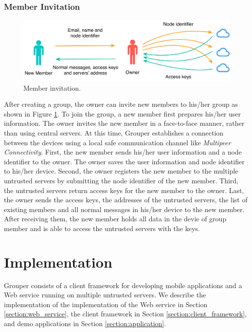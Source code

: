 \documentclass[a4paper,11pt]{report}
\begin{document}
\subsection{Member Invitation}

\begin{figure}
	\centering
	\includegraphics[scale=0.55]{add_member}
	\caption{Member invitation.}
	\label{fig:add_member}
\end{figure}

After creating a group, the owner can invite new members to his/her group as shown in Figure \ref{fig:add_member}. 
To join the group, a new member first prepares his/her user information. 
The owner invites the new member in a face-to-face manner, rather than using central servers. 
At this time, Grouper establishes a connection between the devices using a local safe communication channel like \emph{Multipeer Connectivity}\cite{mc}. 
First, the new member sends his/her user information and a node identifier to the owner. 
The owner saves the user information and node identifier to his/her device. 
Second, the owner registers the new member to the multiple untrusted servers by submitting the node identifier of the new member. 
Third, the untrusted servers return access keys for the new member to the owner. 
Last, the owner sends the access keys, the addresses of the untrusted servers, the list of existing members and all normal messages in his/her device to the new member.
After receiving them, the new member holds all data in the devie of group member and is able to access the untrusted servers with the keys.

\chapter{Implementation} \label{chapter:implementation}

Grouper consists of a client framework for developing mobile applications and a Web service running on multiple untrusted servers.
We describe the implementation of the implementation of the Web service in Section \ref{section:web_service}, the client framework in Section \ref{section:client_framework}, and demo applications in Section \ref{section:application}.
\end{document}
